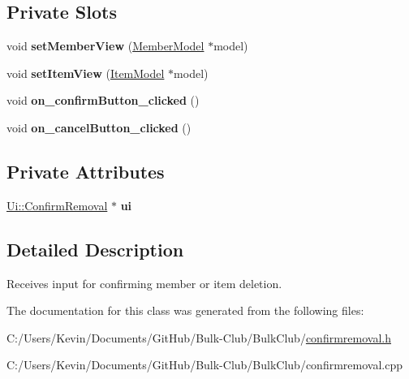 \subsection*{Private Slots}
\begin{DoxyCompactItemize}
\item 
\mbox{\label{class_confirm_removal_aa00e7fff6cdcf320b9f5768946ddc3cf}} 
void {\bfseries set\+Member\+View} (\mbox{\hyperlink{class_member_model}{Member\+Model}} $\ast$model)
\item 
\mbox{\label{class_confirm_removal_a88cb0154a10b053bf47996ee51b32298}} 
void {\bfseries set\+Item\+View} (\mbox{\hyperlink{class_item_model}{Item\+Model}} $\ast$model)
\item 
\mbox{\label{class_confirm_removal_a1a9bf06a4b5c7871eae10b86d181bb85}} 
void {\bfseries on\+\_\+confirm\+Button\+\_\+clicked} ()
\item 
\mbox{\label{class_confirm_removal_a7fa598205beee92035213e06bd8e8a7a}} 
void {\bfseries on\+\_\+cancel\+Button\+\_\+clicked} ()
\end{DoxyCompactItemize}
\subsection*{Private Attributes}
\begin{DoxyCompactItemize}
\item 
\mbox{\label{class_confirm_removal_a6698373ca82cff894c0a299ed4bba11f}} 
\mbox{\hyperlink{class_ui_1_1_confirm_removal}{Ui\+::\+Confirm\+Removal}} $\ast$ {\bfseries ui}
\end{DoxyCompactItemize}


\subsection{Detailed Description}
Receives input for confirming member or item deletion. 

The documentation for this class was generated from the following files\+:\begin{DoxyCompactItemize}
\item 
C\+:/\+Users/\+Kevin/\+Documents/\+Git\+Hub/\+Bulk-\/\+Club/\+Bulk\+Club/\mbox{\hyperlink{confirmremoval_8h}{confirmremoval.\+h}}\item 
C\+:/\+Users/\+Kevin/\+Documents/\+Git\+Hub/\+Bulk-\/\+Club/\+Bulk\+Club/confirmremoval.\+cpp\end{DoxyCompactItemize}
